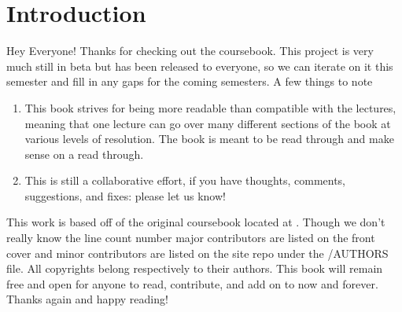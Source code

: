 \chapter{Introduction}

Hey Everyone! Thanks for checking out the coursebook. This project is very much still in beta but has been released to everyone, so we can iterate on it this semester and fill in any gaps for the coming semesters. A few things to note

\begin{enumerate}
	\item This book strives for being more readable than compatible with the lectures, meaning that one lecture can go over many different sections of the book at various levels of resolution. The book is meant to be read through and make sense on a read through.
	\item This is still a collaborative effort, if you have thoughts, comments, suggestions, and fixes: please let us know!
\end{enumerate}

This work is based off of the original coursebook located at . Though we don't really know the line count number major contributors are listed on the front cover and minor contributors are listed on the site repo under the /AUTHORS file. All copyrights belong respectively to their authors. This book will remain free and open for anyone to read, contribute, and add on to now and forever. Thanks again and happy reading!
